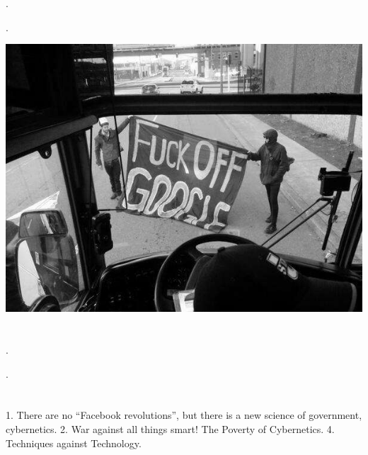 \documentclass[landscape,twocolumn,letterpaper]{article}
\begin{document}
\thispagestyle{empty}
\pagestyle{empty}

\tiny.
\normalsize
\vfill
{}
\eject

\tiny.
\normalsize
\vspace{30 mm}

\begin{center}
  \includegraphics[scale=0.4]{bus.jpg}
  \section*{}
  \subsection*{}    
\end{center}


\newpage
\clearpage

\tiny.
\normalsize
\vfill\eject

\tiny.
\normalsize
\vspace{40 mm}

\section*{}
\vspace{5 mm}

1. There are no “Facebook revolutions”, but
there is a new science of government,
cybernetics. 2. War against all things smart!
The Poverty of Cybernetics. 4. Techniques
against Technology.
\end{document}
